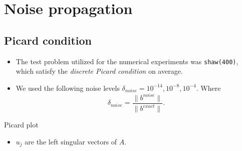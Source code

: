 \documentclass{beamer}
\begin{document}
\section{Noise propagation}
\subsection{Picard condition}
\begin{frame}
  \begin{itemize}
    \item The test problem utilized for the numerical experiments was
      \texttt{shaw(400)}, which satisfy the \emph{discrete Picard condition} on
      average.

    \item We used the following noise levels $\delta_{noise} = 10^{-14}, 
      10^{-8}, 10^{-4}$. Where
      \begin{equation*}
	\delta_{noise} = \frac{\|b^{noise}\|}{\|b^{exact}\|}.
      \end{equation*}
  \end{itemize}
\end{frame}

\begin{frame}{Picard plot}
  \begin{center}
  \end{center}
  \begin{itemize}
    \item $u_{j}$ are the left singular vectors of $A$.
  \end{itemize}
\end{frame}
\end{document}
